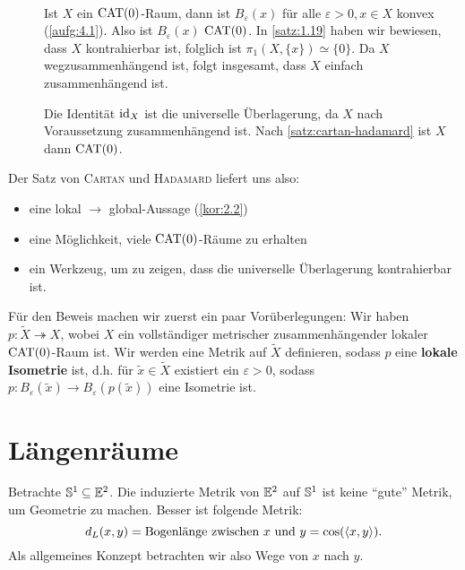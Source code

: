 \begin{beweis}
	\mbox{} \\[-.9cm]
	\begin{description}
		\item[\bewrueck] Ist $X$ ein $\operatorname{CAT(0)}$-Raum, dann ist $B_\varepsilon(x)$ für alle $\varepsilon > 0, x \in X$ konvex (\autoref{aufg:4.1}). Also ist $B_\varepsilon(x)$ $\operatorname{CAT(0)}$.
		In \autoref{satz:1.19} haben wir bewiesen, dass $X$ kontrahierbar ist, folglich ist $\pi_1(X,\{x\}) \simeq \{0\}$.
		Da $X$ wegzusammenhängend ist, folgt insgesamt, dass $X$ einfach zusammenhängend ist.
		\item[\bewhin] Die Identität $\operatorname{id}_X$ ist die universelle Überlagerung, da $X$ nach Voraussetzung zusammenhängend ist. Nach \autoref{satz:cartan-hadamard} ist $X$ dann $\operatorname{CAT(0)}$. \qedhere
	\end{description}
\end{beweis}

Der Satz von \textsc{Cartan} und \textsc{Hadamard} liefert uns also:
\begin{itemize}
	\item eine lokal $\rightarrow$ global-Aussage (\autoref{kor:2.2})
	\item eine Möglichkeit, viele $\operatorname{CAT(0)}$-Räume zu erhalten
	\item ein Werkzeug, um zu zeigen, dass die universelle Überlagerung kontrahierbar ist.
\end{itemize}

Für den Beweis machen wir zuerst ein paar Vorüberlegungen: Wir haben $p \colon \tilde{X} \twoheadrightarrow X$, wobei $X$ ein vollständiger metrischer zusammenhängender lokaler $\operatorname{CAT(0)}$-Raum ist. Wir werden eine Metrik auf $\tilde{X}$ definieren, sodass $p$ eine \textbf{lokale Isometrie} ist, d.h. für $\tilde{x} \in \tilde{X}$ existiert ein $\varepsilon > 0$, sodass $p \colon B_\varepsilon(\tilde{x}) \rightarrow B_\varepsilon(p(\tilde{x}))$ eine Isometrie ist.

\section{Längenräume}
\label{sec:2.1}
	Betrachte $\mathbb{S}^1 \subseteq \mathbb{E}^2$. Die induzierte Metrik von $\mathbb{E}^2$ auf $\mathbb{S}^1$ ist keine \enquote{gute} Metrik, um Geometrie zu machen. Besser ist folgende Metrik:
	\[
		d_L(x,y) = \text{Bogenlänge zwischen } x \text{ und } y = \cos(\langle x,y\rangle).
	\]
	Als allgemeines Konzept betrachten wir also Wege von $x$ nach $y$.
	
